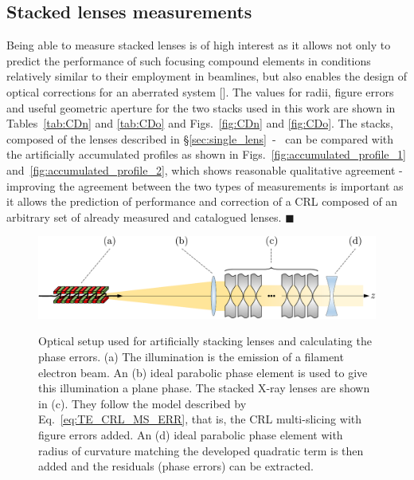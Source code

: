 \begin{refsection}
\subsection{Stacked lenses measurements}\label{sec:lens_stack}

Being able to measure stacked lenses is of high interest as it allows not only to predict the performance of such focusing compound elements in conditions relatively similar to their employment in beamlines, but also enables the design of optical corrections for an aberrated system [\cite{Seiboth2017, Seiboth2020}]. The values for radii, figure errors and useful geometric aperture for the two stacks used in this work are shown in Tables~\ref{tab:CDn} and \ref{tab:CDo} and Figs.~\ref{fig:CDn} and \ref{fig:CDo}. The stacks, composed of the lenses described in \S\ref{sec:single_lens}~-~\textit{} can be compared with the artificially accumulated profiles as shown in Figs.~\ref{fig:accumulated_profile_1} and~\ref{fig:accumulated_profile_2}, which shows reasonable qualitative agreement - improving the agreement between the two types of measurements is important as it allows the prediction of performance and correction of a CRL composed of an arbitrary set of already measured and catalogued lenses. $\blacksquare$

\begin{figure}[t]
    \centering
    {\includegraphics[width=.7\linewidth]{figures/ch04b/recovered_phase.pdf}}
    \caption[Optical layout used for artificially stacking lenses]{Optical setup used for artificially stacking lenses and calculating the phase errors. (a) The illumination is the emission of a filament electron beam. An (b) ideal parabolic phase element is used to give this illumination a plane phase. The stacked X-ray lenses are shown in (c). They follow the model described by Eq.~\ref{eq:TE_CRL_MS_ERR}, that is, the CRL multi-slicing with figure errors added. An (d) ideal parabolic phase element with radius of curvature matching the developed quadratic term is then added and the residuals (phase errors) can be extracted.}
    \label{fig:accumulated_extraction}
\end{figure}


\end{refsection}
